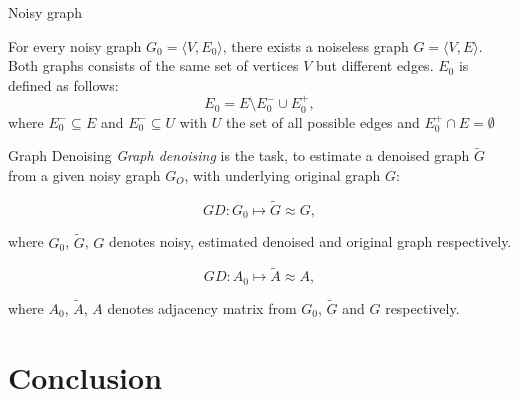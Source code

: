 \documentclass[aspectratio=169]{beamer}
\begin{document}
\begin{frame}[c]{Noisy graph}

    \begin{theorem}
        For every noisy graph $G_0 = \langle V, E_0 \rangle$, 
        there exists a noiseless graph $G = \langle V, E \rangle$.
        Both graphs consists of the same set of vertices $V$ but different edges.
        $E_0$  is defined as follows:
        $$E_0 = E \setminus  E^{-}_0 \cup  E^{+}_0,$$
        where $E^{-}_0 \subseteq E$ and $E^{-}_0 \subseteq U$ with $U$ the set of all possible edges and $E^{+}_0 \cap E = \emptyset$
    \end{theorem}

\end{frame}

\begin{frame}[c]{Graph Denoising}
    \textit{Graph denoising} is the task, to estimate a denoised graph $\tilde{G}$  
    from a given noisy graph $G_O$, with underlying original graph $G$:

    \begin{definition}
        $$GD: G_0 \mapsto \tilde{G} \approx G,$$
    \end{definition}
    where $G_0$, $\tilde{G}$, $G$ denotes noisy, estimated denoised and original graph respectively.
    
    \begin{definition}
        $$GD: A_0 \mapsto \tilde{A} \approx A,$$
    \end{definition}
    where $A_0$, $\tilde{A}$, $A$ denotes adjacency matrix from $G_0$, $\tilde{G}$ and $G$ respectively.

\end{frame}

\section{Conclusion}
\end{document}

